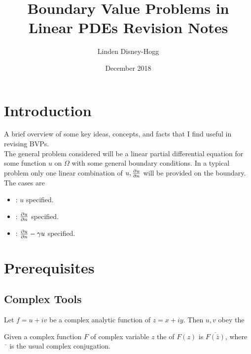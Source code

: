 \documentclass{article}
\title{Boundary Value Problems in Linear PDEs Revision Notes}
\author{Linden Disney-Hogg}
\date{December 2018}
\begin{document}
\maketitle
\tableofcontents

\section{Introduction}
A brief overview of some key ideas, concepts, and facts that I find useful in revising BVPs. \\
The general problem considered will be a linear partial differential equation for some function $u$ on $\Omega$ with some general boundary conditions. In a typical problem only one linear combination of $u, \pd[u]{n}$ will be provided on the boundary. The cases are 
\begin{itemize}
    \item {} : $u$ specified. 
    \item {} : $\pd[u]{n}$ specified.
    \item {} : $\pd[u]{n} - \gamma u$ specified. 
\end{itemize}

\section{Prerequisites}
\subsection{Complex Tools}

\begin{lemma}
Let $f = u+iv$ be a complex analytic function of $z = x+iy$. Then $u,v$ obey the  
\end{lemma}

\begin{definition}
Given a complex function $F$ of complex variable $z$ the  of $F(z)$ is $\overline{F(\bar{z})}$, where $\bar{\phantom{z}}$ is the usual complex conjugation. 
\end{definition}
\end{document}

